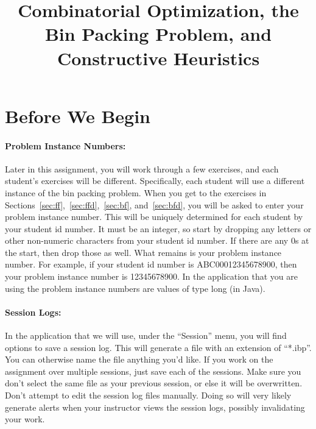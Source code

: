 \documentclass[11pt,letterpaper]{article}
\begin{document}
\title{Combinatorial Optimization, the Bin Packing Problem, 
and Constructive Heuristics}

\author{}

\date{}

\maketitle

\section{Before We Begin}\label{sec:before}


\paragraph*{Problem Instance Numbers:}
Later in this assignment, you will work through a few exercises,
and each student's exercises will be different. Specifically, 
each student will use a different instance of the bin packing problem.
When you get to the exercises in Sections~\ref{sec:ff},~\ref{sec:ffd},~\ref{sec:bf}, 
and~\ref{sec:bfd}, you will be asked to enter your problem instance number.
This will be uniquely determined for each student by your student id number.
It must be an integer, so start by dropping any letters or other non-numeric
characters from your student id number. If there are any 0s at the start, then
drop those as well. What remains is your problem instance number.
For example, if your student id number is ABC00012345678900, then your
problem instance number is 12345678900. In the application that you are using
the problem instance numbers are values of type long (in Java).

\paragraph*{Session Logs:}
In the application that we will use, under the ``Session'' menu, you will
find options to save a session log. This will generate a file with an 
extension of ``*.ibp''. You can otherwise name the file anything you'd like.
If you work on the assignment over multiple sessions, just save each of the 
sessions. Make sure you don't select the same file as your previous session,
or else it will be overwritten. Don't attempt to edit the session log files
manually. Doing so will very likely generate alerts when your instructor
views the session logs, possibly invalidating your work.
\end{document}
